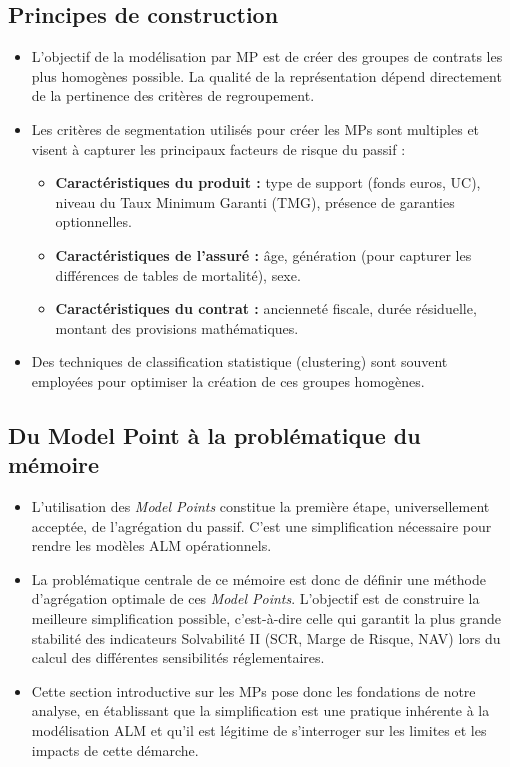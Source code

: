 \subsection{Principes de construction}
\begin{itemize}
    \item L'objectif de la modélisation par MP est de créer des groupes de contrats les plus homogènes possible. La qualité de la représentation dépend directement de la pertinence des critères de regroupement. \newline{}
    \item Les critères de segmentation utilisés pour créer les MPs sont multiples et visent à capturer les principaux facteurs de risque du passif :
    \begin{itemize}
        \item \textbf{Caractéristiques du produit :} type de support (fonds euros, UC), niveau du Taux Minimum Garanti (TMG), présence de garanties optionnelles.
        \item \textbf{Caractéristiques de l'assuré :} âge, génération (pour capturer les différences de tables de mortalité), sexe.
        \item \textbf{Caractéristiques du contrat :} ancienneté fiscale, durée résiduelle, montant des provisions mathématiques.
    \end{itemize}
    \item Des techniques de classification statistique (clustering) sont souvent employées pour optimiser la création de ces groupes homogènes.
\end{itemize}

\subsection{Du Model Point à la problématique du mémoire}
\begin{itemize}
    \item L'utilisation des \textit{Model Points} constitue la première étape, universellement acceptée, de l'agrégation du passif. C'est une simplification nécessaire pour rendre les modèles ALM opérationnels. \newline{}
    \item La problématique centrale de ce mémoire est donc de définir une méthode d'agrégation optimale de ces \textit{Model Points}. L'objectif est de construire la meilleure simplification possible, c'est-à-dire celle qui garantit la plus grande stabilité des indicateurs Solvabilité II (SCR, Marge de Risque, NAV) lors du calcul des différentes sensibilités réglementaires. \newline{}
    \item Cette section introductive sur les MPs pose donc les fondations de notre analyse, en établissant que la simplification est une pratique inhérente à la modélisation ALM et qu'il est légitime de s'interroger sur les limites et les impacts de cette démarche.
\end{itemize}
